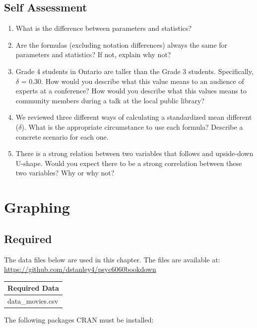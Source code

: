 \documentclass[
]{krantz}
\begin{document}
\hypertarget{self-assessment}{%
\section{Self Assessment}\label{self-assessment}}

\begin{enumerate}
\def\labelenumi{\arabic{enumi}.}
\item
  What is the difference between parameters and statistics?
\item
  Are the formulas (excluding notation differences) always the same for parameters and statistics? If not, explain why not?
\item
  Grade 4 students in Ontario are taller than the Grade 3 students. Specifically, \(\delta\) = 0.30. How would you describe what this value means to an audience of experts at a conference? How would you describe what this values means to community members during a talk at the local public library?
\item
  We reviewed three different ways of calculating a standardized mean different (\(\delta\)). What is the appropriate circumstance to use each formula? Describe a concrete scenario for each one.
\item
  There is a strong relation between two variables that follows and upside-down U-shape. Would you expect there to be a strong correlation between these two variables? Why or why not?
\end{enumerate}

\hypertarget{graphing}{%
\chapter{Graphing}\label{graphing}}

\hypertarget{required-1}{%
\section{Required}\label{required-1}}

The data files below are used in this chapter. The files are available at: \url{https://github.com/dstanley4/psyc6060bookdown}

\begin{longtable}[]{@{}l@{}}
\toprule
Required Data\tabularnewline
\midrule
\endhead
data\_movies.csv\tabularnewline
\bottomrule
\end{longtable}

The following packages CRAN must be installed:
\end{document}
